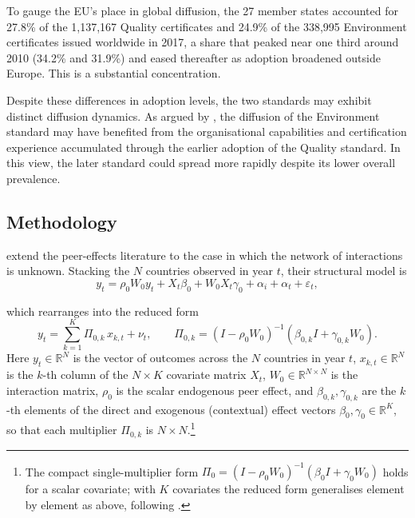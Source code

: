 \documentclass[12pt,a4paper]{article}
\begin{document}
To gauge the EU's place in global diffusion, the 27 member states accounted for 27.8\% of the 1{,}137{,}167 Quality certificates and 24.9\% of the 338{,}995 Environment certificates issued worldwide in 2017, a share that peaked near one third around 2010 (34.2\% and 31.9\%) and eased thereafter as adoption broadened outside Europe. This is a substantial concentration.

Despite these differences in adoption levels, the two standards may exhibit distinct diffusion dynamics. As argued by \citet{albuquerque2007}, the diffusion of the Environment standard may have benefited from the organisational capabilities and certification experience accumulated through the earlier adoption of the Quality standard. In this view, the later standard could spread more rapidly despite its lower overall prevalence.




\subsection{Methodology}
\label{sec:methodology}

\citet{depaula2025} extend the peer-effects literature \citep{manski1993, bramoulle2009} to the case in which the network of interactions is unknown. Stacking the $N$ countries observed in year $t$, their structural model is
\begin{equation}
    y_t = \rho_0 W_0 y_t + X_t \beta_0 + W_0 X_t \gamma_0 + \alpha_i + \alpha_t + \varepsilon_t,
    \label{eq:structural}
\end{equation}

which rearranges into the reduced form
\begin{equation}
    y_t = \sum_{k=1}^{K} \Pi_{0,k}\, x_{k,t} + \nu_t, \qquad
    \Pi_{0,k} = (I - \rho_0 W_0)^{-1}\!\left(\beta_{0,k} I + \gamma_{0,k} W_0\right).
    \label{eq:reduced}
\end{equation}
Here $y_t \in \mathbb{R}^{N}$ is the vector of outcomes across the $N$ countries in year $t$, $x_{k,t} \in \mathbb{R}^{N}$ is the $k$-th column of the $N \times K$ covariate matrix $X_t$, $W_0 \in \mathbb{R}^{N \times N}$ is the interaction matrix, $\rho_0$ is the scalar endogenous peer effect, and $\beta_{0,k}, \gamma_{0,k}$ are the $k$-th elements of the direct and exogenous (contextual) effect vectors $\beta_0, \gamma_0 \in \mathbb{R}^{K}$, so that each multiplier $\Pi_{0,k}$ is $N \times N$.\footnote{The compact single-multiplier form $\Pi_0 = (I-\rho_0 W_0)^{-1}(\beta_0 I + \gamma_0 W_0)$ holds for a scalar covariate; with $K$ covariates the reduced form generalises element by element as above, following \citet[Appendix B]{depaula2025}.}
\end{document}
